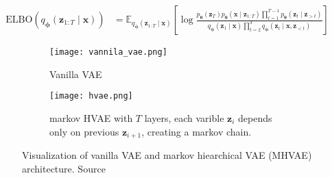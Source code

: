 \begin{align}
    \mathrm{ELBO}(q_{\boldsymbol{\phi}}(\boldsymbol{z}_{1:T}\mid\boldsymbol{x}))  &=
    \mathbb{E}_{q_{\boldsymbol{\phi}}(\boldsymbol{z}_{1:T}\mid\boldsymbol{x})}\left[\log \frac{p_{\boldsymbol{\theta}}(\boldsymbol{z}_T)p_{\boldsymbol{\theta}}(\boldsymbol{x}\mid\boldsymbol{z}_{1:T})\prod_{t=1}^{T-1}p_{\boldsymbol{\theta}}(\boldsymbol{z}_{t}\mid\boldsymbol{z}_{>t})}{q_{\boldsymbol{\phi}}(\boldsymbol{z}_1\mid\boldsymbol{x})\prod_{t=2}^{T}q_{\boldsymbol{\phi}}(\boldsymbol{z}_{t}\mid\boldsymbol{x},\boldsymbol{z}_{<t})}\right]
\end{align}

\begin{figure}[]
    \centering
    \begin{subfigure}[b]{0.27\textwidth}
        \centering
        \texttt{[image: vannila\_vae.png]}
        \caption[]{Vanilla VAE}
        \label{fig:vanilla-vae}
    \end{subfigure}
    \hfill
    \begin{subfigure}[b]{0.63\textwidth}
        \centering
        \texttt{[image: hvae.png]}
        \caption[]{markov HVAE with $T$ layers, each varible $\boldsymbol{z}_i$ depends only on previous $\boldsymbol{z}_{i+1}$, creating a markov chain.}
        \label{fig:mhvae}
    \end{subfigure}
    \caption[VAE vs HVAE architecture]{Visualization of vanilla VAE and markov hiearchical VAE (MHVAE) architecture. Source \cite{diffusion-models-blog-2018}}
    \label{fig:vae-architecture}
\end{figure}



